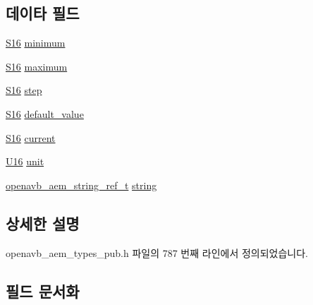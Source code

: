 \subsection*{데이타 필드}
\begin{DoxyCompactItemize}
\item 
\hyperlink{openavb__types__base__pub_8h_a6d241ad21a823c90d4835380787db5d4}{S16} \hyperlink{structopenavb__aem__control__value__format__control__linear__int16__t_afedc2c02b98a14e3eb48226e70232079}{minimum}
\item 
\hyperlink{openavb__types__base__pub_8h_a6d241ad21a823c90d4835380787db5d4}{S16} \hyperlink{structopenavb__aem__control__value__format__control__linear__int16__t_a213edb1d58da5854d5a3a55374a56ecd}{maximum}
\item 
\hyperlink{openavb__types__base__pub_8h_a6d241ad21a823c90d4835380787db5d4}{S16} \hyperlink{structopenavb__aem__control__value__format__control__linear__int16__t_a84b85b74dff84d0ecc616c2dac973b2f}{step}
\item 
\hyperlink{openavb__types__base__pub_8h_a6d241ad21a823c90d4835380787db5d4}{S16} \hyperlink{structopenavb__aem__control__value__format__control__linear__int16__t_ad8f5600a175df4eccac80c2c50fd8a55}{default\+\_\+value}
\item 
\hyperlink{openavb__types__base__pub_8h_a6d241ad21a823c90d4835380787db5d4}{S16} \hyperlink{structopenavb__aem__control__value__format__control__linear__int16__t_a3cc36a69adc01a6dc757a92ed1fab775}{current}
\item 
\hyperlink{openavb__types__base__pub_8h_a0a0a322d5fa4a546d293a77ba8b4a71f}{U16} \hyperlink{structopenavb__aem__control__value__format__control__linear__int16__t_a0b3ff376c10369016824076deacc055e}{unit}
\item 
\hyperlink{structopenavb__aem__string__ref__t}{openavb\+\_\+aem\+\_\+string\+\_\+ref\+\_\+t} \hyperlink{structopenavb__aem__control__value__format__control__linear__int16__t_a1f81001cefa769cb3651172fd5ab0748}{string}
\end{DoxyCompactItemize}


\subsection{상세한 설명}


openavb\+\_\+aem\+\_\+types\+\_\+pub.\+h 파일의 787 번째 라인에서 정의되었습니다.



\subsection{필드 문서화}
